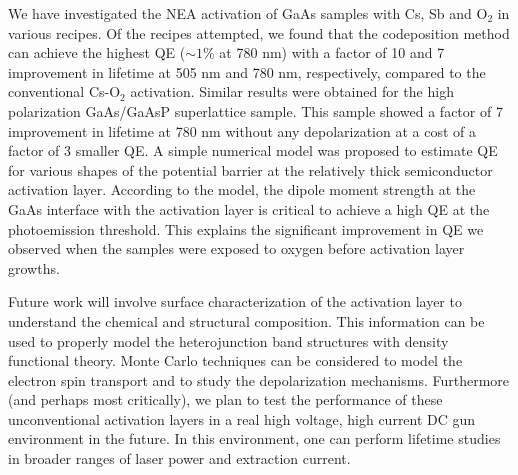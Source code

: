 We have investigated the NEA activation of GaAs samples with Cs, Sb and O$_2$ in various recipes. Of the recipes attempted, we found that the codeposition method can achieve the highest QE ($\sim 1\%$ at 780 nm) with a factor of 10 and 7 improvement in lifetime at 505 nm and 780 nm, respectively, compared to the conventional Cs-O$_2$ activation.
Similar results were obtained for the high polarization GaAs/GaAsP superlattice sample. This sample showed a factor of 7 improvement in lifetime at 780 nm without any depolarization at a cost of a factor of 3 smaller QE.
A simple numerical model was proposed to estimate QE for various shapes of the potential barrier at the relatively thick semiconductor activation layer. According to the model, the dipole moment strength at the GaAs interface with the activation layer is critical to achieve a high QE at the photoemission threshold. This explains the significant improvement in QE we observed when the samples were exposed to oxygen before activation layer growths.

Future work will involve surface characterization of the activation layer to understand the chemical and structural composition. This information can be used to properly model the heterojunction band structures with density functional theory. Monte Carlo techniques can be considered to model the electron spin transport and to study the depolarization mechanisms. Furthermore (and perhaps most critically), we plan to test the performance of these unconventional activation layers in a real high voltage, high current DC gun environment in the future. In this environment, one can perform lifetime studies in broader ranges of laser power and extraction current. 

